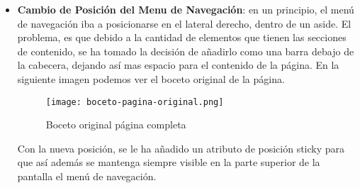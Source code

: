 \begin{itemize}
    \item \textbf{Cambio de Posición del Menu de Navegación}: en un principio, el menú de navegación iba a posicionarse en el lateral derecho, dentro de un aside. El problema, es que debido a la cantidad de elementos que tienen las secciones de contenido, se ha tomado la decisión de añadirlo como una barra debajo de la cabecera, dejando así mas espacio para el contenido de la página. En la siguiente imagen podemos ver el
    boceto original de la página.

    \begin{figure}[H]
        \centering
        \texttt{[image: boceto-pagina-original.png]}
        \caption{Boceto original página completa}
    \end{figure}

    Con la nueva posición, se le ha añadido un atributo de posición sticky para que así además se mantenga siempre visible en la parte superior de la pantalla el menú de navegación.
\end{itemize}






%
%

